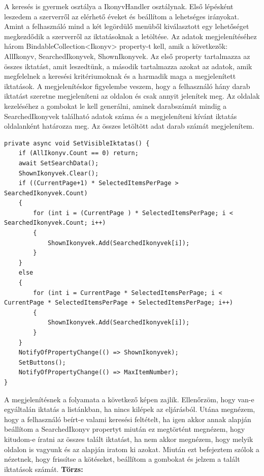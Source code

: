 \documentclass[
]{thesis-ekf}
\theoremstyle{definition}
\theoremstyle{remark}
\begin{document}
A keresés is gyermek osztálya a IkonyvHandler osztálynak. Első lépésként leszedem a szerverről az elérhető éveket és beállítom a lehetséges irányokat. Amint a felhasználó mind a két legördülő menüből kiválasztott egy lehetőséget megkezdődik a szerverről az iktatásoknak a letöltése. Az adatok megjelenítéséhez három BindableCollection<Ikonyv> property-t kell, amik a következők: AllIkonyv, SearchedIkonyvek, ShownIkonyvek. Az első property tartalmazza az összes iktatást, amit leszedtünk, a második tartalmazza azokat az adatok, amik megfelelnek a keresési kritériumoknak és a harmadik maga a megjelenített iktatások. A megjelenítéskor figyelembe veszem, hogy a felhasználó hány darab iktatást szeretne megjeleníteni az oldalon és csak annyit jelenítek meg. Az oldalak kezeléséhez a gombokat le kell generálni, aminek darabszámát mindig a SearchedIkonyvek található adatok száma és a megjeleníteni kívánt iktatás oldalanként határozza meg. Az összes letöltött adat darab számát megjelenítem.
\begin{lstlisting}[caption={Megjeleníthető iktatások a keresésben.},captionpos=b]
private async void SetVisibleIktatas() {	
	if (AllIkonyv.Count == 0) return;
	await SetSearchData();
	ShownIkonyvek.Clear();
	if ((CurrentPage+1) * SelectedItemsPerPage > SearchedIkonyvek.Count)
	{
		for (int i = (CurrentPage ) * SelectedItemsPerPage; i < SearchedIkonyvek.Count; i++)
		{
			ShownIkonyvek.Add(SearchedIkonyvek[i]);
		}
	}
	else 
	{
		for (int i = CurrentPage * SelectedItemsPerPage; i < CurrentPage * SelectedItemsPerPage + SelectedItemsPerPage; i++)
		{
			ShownIkonyvek.Add(SearchedIkonyvek[i]);
		}
	}
	NotifyOfPropertyChange(() => ShownIkonyvek);	
	SetButtons();
	NotifyOfPropertyChange(() => MaxItemNumber);
} 
\end{lstlisting}

A megjelenítésnek a folyamata a következő képen zajlik. Ellenőrzöm, hogy van-e egyáltalán iktatás a listánkban, ha nincs kilépek az eljárásból. Utána megnézem, hogy a felhasználó beírt-e valami keresési feltételt, ha igen akkor annak alapján beállítom a SearchedIkonyv propertyt miután ez megtörtént megnézem, hogy kitudom-e íratni az összes talált iktatást, ha nem akkor megnézem, hogy melyik oldalon is vagyunk és az alapján iratom ki azokat. Miután ezt befejeztem szólok a nézetnek, hogy frissítse a kötéseket, beállítom a gombokat és jelzem a talált iktatások számát.
\textbf{Törzs:}
\end{document}
